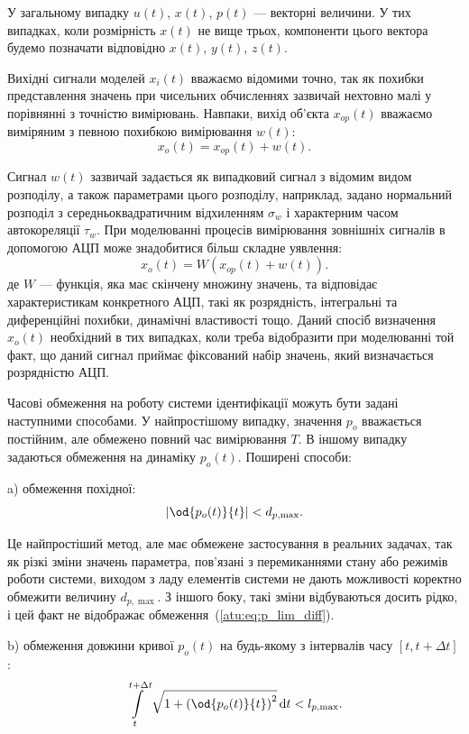 У загальному випадку
$u(t)$,
$x(t)$,
$p(t)$ --- векторні величини. У тих випадках, коли розмірність
$x(t)$ не вище трьох, компоненти цього вектора будемо позначати
відповідно
$x(t)$,
$y(t)$,
$z(t)$.

Вихідні сигнали моделей \label{atu:d:x} $x_i(t)$ вважаємо відомими точно,
так як похибки представлення значень при чисельних обчисленнях зазвичай нехтовно малі у порівнянні з
точністю вимірювань. Навпаки, вихід об'єкта
$x_{op}(t)$ вважаємо виміряним з певною похибкою вимірювання
\label{atu:d:w}
$w(t)$:
%
\[
  x_o(t) = x_{op}(t) + w(t).
\]

Сигнал
$w(t)$ зазвичай задається як випадковий сигнал з відомим видом
розподілу, а також параметрами цього розподілу, наприклад,
задано нормальний розподіл з середньоквадратичним відхиленням
$\sigma_w$ і характерним часом автокореляції
$\tau_w$. При моделюванні процесів вимірювання зовнішніх сигналів
в допомогою АЦП може знадобитися більш складне уявлення:
%
\[
  x_o(t) = W( x_{op}(t) + w(t) ).
\]
%
де
$W$ --- функція, яка має скінчену множину значень, та відповідає
характеристикам конкретного АЦП, такі як розрядність,
інтегральні та диференційні похибки, динамічні властивості тощо.
Даний спосіб визначення
$x_o(t)$ необхідний в тих випадках, коли треба відобразити при
моделюванні той факт, що даний сигнал приймає фіксований набір
значень, який визначається розрядністю АЦП.

Часові обмеження на роботу системи ідентифікації можуть бути
задані наступними способами. У найпростішому випадку, значення
$p_o$ вважається постійним, але обмежено повний час вимірювання
$T$. В іншому випадку задаються обмеження на динаміку
$p_o(t)$. Поширені способи:

a) обмеження похідної:
%
\begin{equation}
  \left| \od{p_o(t)}{t} \right| < d_{p,\max}.
  \label{atu:eq:p_lim_diff}
\end{equation}

Це найпростіший метод, але має обмежене застосування в реальних
задачах, так як різкі зміни значень параметра, пов'язані з
перемиканнями стану або режимів роботи системи, виходом з
ладу елементів системи не дають можливості коректно обмежити
величину
$d_{p, \max}$. З іншого боку, такі зміни відбуваються досить рідко,
і цей факт не відображає обмеження~(\ref{atu:eq:p_lim_diff}).

b) обмеження довжини кривої
$p_o(t)$ на будь-якому з інтервалів часу
$[t, t + \Delta t]$:
\begin{equation}
  \int\limits_{t}^{t+\Delta t} \sqrt{1 + \left( \od{p_o(t)}{t} \right)^2 } \, \mathrm{d}t < l_{p,\max}.
  \label{atu:eq:p_lim_l}
\end{equation}

